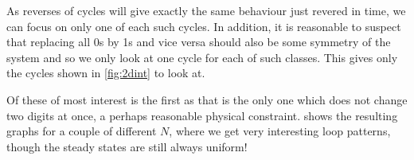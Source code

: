 \documentclass[11pt]{article}
\begin{document}
As reverses of cycles will give exactly the same behaviour just revered in time, we can focus on only one of each such cycles.
In addition, it is reasonable to suspect that replacing all 0s by 1s and vice versa should also be some symmetry of the system and so we only look at one cycle for each of such classes.
This gives only the cycles shown in \cref{fig:2dint} to look at.

Of these of most interest is the first as that is the only one which does not change two digits at once, a perhaps reasonable physical constraint.
 shows the resulting graphs for a couple of different $N$, where we get very interesting loop patterns, though the steady states are still always uniform!

\begin{tcolorbox}
    \begin{figure}[H]
        \centering
        \begin{subfigure}[t]{0.2\textwidth}
            \centering
            \caption{}\label{fig:2dbase}
        \end{subfigure}
        \begin{subfigure}[t]{0.2\textwidth}
            \centering
            \caption{}
        \end{subfigure}
        \begin{subfigure}[t]{0.2\textwidth}
            \centering
\end{subfigure}
\end{figure}
\end{tcolorbox}
\end{document}

